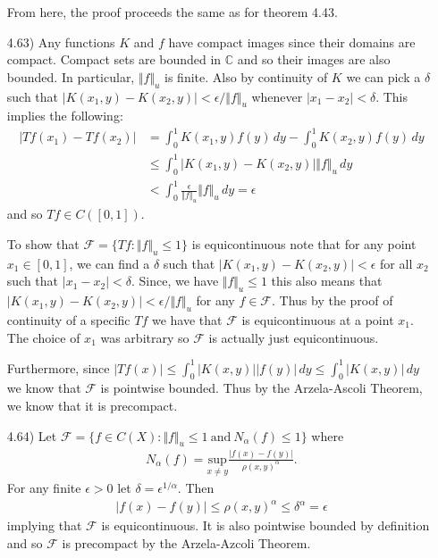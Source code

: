 \documentclass[11pt,letter]{article}
\begin{document}
\begin{enumerate}
    From here, the proof proceeds the same as for theorem 4.43.
    
    \item [4.63)] Any functions $K$ and $f$ have compact images since their domains are compact. Compact sets are bounded in $\mathbb{C}$ and so their images are also bounded. In particular, $\Vert f \Vert_u$ is finite. Also by continuity of $K$ we can pick a $\delta$ such that $\vert K(x_1,y) - K(x_2,y) \vert < \epsilon / \Vert f \Vert_u$ whenever $\vert x_1 - x_2 \vert < \delta$. This implies the following:
    \begin{align*}
        \vert Tf(x_1) - Tf(x_2) \vert &  = \int_0^1 K(x_1,y)f(y)\,dy - \int_0^1 K(x_2,y)f(y)\,dy \\
        & \le \int_0^1 \vert K(x_1,y) - K(x_2,y) \vert \Vert f \Vert_u \,dy \\
        & < \int_0^1 \frac{\epsilon}{\Vert f \Vert_u} \Vert f \Vert_u \,dy = \epsilon
    \end{align*}
    and so $Tf \in C([0,1])$.

    To show that $\mathcal{F} = \{Tf: \Vert f \Vert_u \le 1\}$ is equicontinuous note that for any point $x_1 \in [0,1]$, we can find a $\delta$ such that $\vert K(x_1,y) - K(x_2,y) \vert < \epsilon$ for all $x_2$ such that $\vert x_1 - x_2 \vert < \delta$. Since, we have $\Vert f \Vert_u \le 1$ this also means that $\vert K(x_1,y) - K(x_2,y) \vert < \epsilon/\Vert f \Vert_u$ for any $f \in \mathcal{F}$. Thus by the proof of continuity of a specific $Tf$ we have that $\mathcal{F}$ is equicontinuous at a point $x_1$. The choice of $x_1$ was arbitrary so $\mathcal{F}$ is actually just equicontinuous.

    Furthermore, since $\vert Tf(x) \vert \le \int_0^1 \vert  K(x,y) \vert \vert f(y) \vert \,dy \le \int_0^1 \vert K(x,y) \vert \,dy$ we know that $\mathcal{F}$ is pointwise bounded. Thus by the Arzela-Ascoli Theorem, we know that it is precompact.
    
    \item [4.64)] Let $\mathcal{F} = \{f \in C(X): \Vert f \Vert_u \le 1\ \text{and}\ N_\alpha(f) \le 1\}$ where
    \begin{align*}
        N_\alpha(f) = \underset{x\ne y}{\text{sup}} \frac{\vert f(x) - f(y) \vert}{\rho(x,y)^\alpha}.
    \end{align*}
    For any finite $\epsilon > 0$ let $\delta = \epsilon^{1/\alpha}$. Then 
    \begin{align*}
        \vert f(x) - f(y) \vert \le \rho(x,y)^\alpha \le \delta^\alpha = \epsilon
    \end{align*}
    implying that $\mathcal{F}$ is equicontinuous. It is also pointwise bounded by definition and so $\mathcal{F}$ is precompact by the Arzela-Azcoli Theorem.


\end{enumerate}
\end{document}
